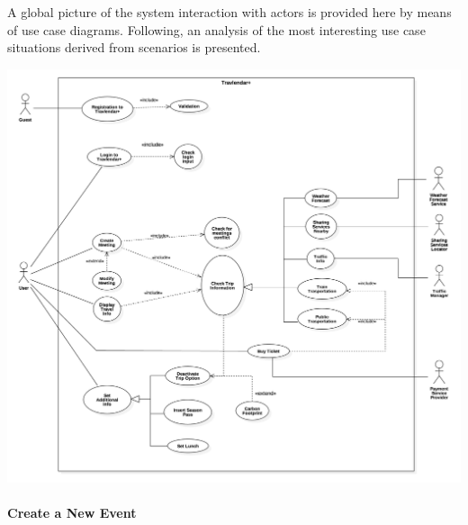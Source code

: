 A global picture of the system interaction with actors is provided here by means of use case diagrams. Following, an analysis of the most interesting use case situations derived from scenarios is presented.

	\includegraphics[width=\textwidth]{img/uml/useCase.png}

	\vfill
	
	\paragraph{Create a New Event}
	
